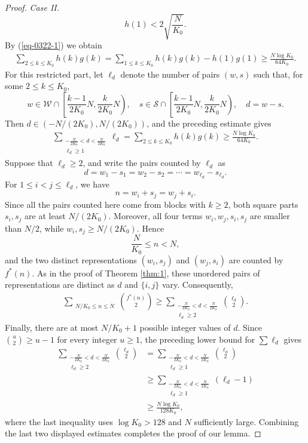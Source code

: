 \documentclass[12pt,a4paper,reqno]{amsart}
\numberwithin{equation}{section}
\theoremstyle{plain}
\theoremstyle{definition}
\begin{document}
\begin{proof}
{\it Case II.} 
$$
h(1)< 2\sqrt{\frac{N}{K_0}}.
$$
By (\ref{eq-0322-1}) we obtain
\begin{align*}
\sum_{2\le k\le K_0}h(k)g(k)=\sum_{1\le k\le K_0}h(k)g(k)-h(1)g(1)\ge \frac{N\log K_0}{64K_0}.
\end{align*}
For this restricted part, let \(\ell_d\) denote the number of pairs \((w,s)\) such that, for some \(2\le k\le K_0\),
\[
w\in\mathcal{W}\cap\left[\frac{k-1}{2K_0}N,\frac{k}{2K_0}N\right),
\quad
s\in\mathcal{S}\cap\left[\frac{k-1}{2K_0}N,\frac{k}{2K_0}N\right),
\quad d=w-s.
\]
Then \(d\in(-N/(2K_0),N/(2K_0))\), and the preceding estimate gives
\begin{align*}
\sum_{\substack{-\frac{N}{2K_0}<d<\frac{N}{2K_0}\\ \ell_d\ge 1}}\ell_d
=\sum_{2\le k\le K_0}h(k)g(k)
\ge \frac{N\log K_0}{64K_0}.
\end{align*}
Suppose that \(\ell_d\ge2\), and write the pairs counted by \(\ell_d\) as
\[
d=w_1-s_1=w_2-s_2=\cdots=w_{\ell_d}-s_{\ell_d}.
\]
For \(1\le i<j\le \ell_d\), we have
\[
n=w_i+s_j=w_j+s_i.
\]
Since all the pairs counted here come from blocks with \(k\ge2\), both square parts \(s_i,s_j\) are at least \(N/(2K_0)\). Moreover, all four terms \(w_i,w_j,s_i,s_j\) are smaller than \(N/2\), while \(w_i,s_j\ge N/(2K_0)\). Hence
\[
\frac{N}{K_0}\le n<N,
\]
and the two distinct representations \((w_i,s_j)\) and \((w_j,s_i)\) are counted by \(f^*(n)\). As in the proof of Theorem \ref{thm:1}, these unordered pairs of representations are distinct as \(d\) and \(\{i,j\}\) vary. Consequently,
\begin{align*}
\sum_{\substack{N/K_0\leq n \leq N}}\binom{f^*(n)}{2}
\geq \sum_{\substack{-\frac{N}{2K_0}<d<\frac{N}{2K_0}\\ \ell_d\ge 2}}\binom{\ell_d}{2}.
\end{align*}
Finally, there are at most \(N/K_0+1\) possible integer values of \(d\). Since \(\binom{u}{2}\ge u-1\) for every integer \(u\ge1\), the preceding lower bound for \(\sum \ell_d\) gives
\begin{align*}
\sum_{\substack{-\frac{N}{2K_0}<d<\frac{N}{2K_0}\\ \ell_d\ge 2}}\binom{\ell_d}{2}
&=\sum_{\substack{-\frac{N}{2K_0}<d<\frac{N}{2K_0}\\ \ell_d\ge 1}}\binom{\ell_d}{2}\\
&\ge \sum_{\substack{-\frac{N}{2K_0}<d<\frac{N}{2K_0}\\ \ell_d\ge 1}}(\ell_d-1)\\
&\ge \frac{N\log K_0}{128K_0},
\end{align*}
where the last inequality uses \(\log K_0>128\) and \(N\) sufficiently large. Combining the last two displayed estimates completes the proof of our lemma.
\end{proof}
\end{document}
